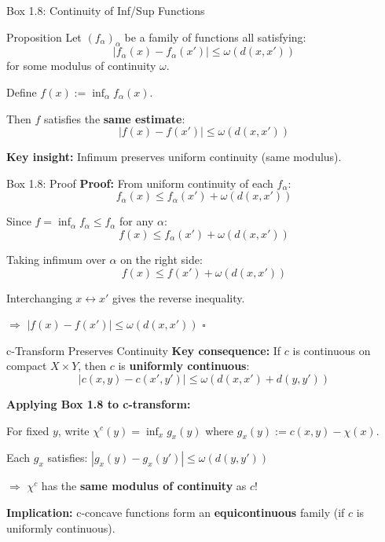 \documentclass[aspectratio=169]{beamer}
\begin{document}
\begin{frame}{Box 1.8: Continuity of Inf/Sup Functions}
\begin{block}{Proposition}
Let $(f_\alpha)_\alpha$ be a family of functions all satisfying:
\[
|f_\alpha(x) - f_\alpha(x')| \leq \omega(d(x,x'))
\]
for some modulus of continuity $\omega$.

Define $f(x) := \inf_\alpha f_\alpha(x)$.

Then $f$ satisfies the \textbf{same estimate}:
\[
|f(x) - f(x')| \leq \omega(d(x,x'))
\]
\end{block}

\vspace{0.3cm}
\textbf{Key insight:} Infimum preserves uniform continuity (same modulus).
\end{frame}

\begin{frame}{Box 1.8: Proof}
\textbf{Proof:} From uniform continuity of each $f_\alpha$:
\[
f_\alpha(x) \leq f_\alpha(x') + \omega(d(x,x'))
\]

Since $f = \inf_\alpha f_\alpha \leq f_\alpha$ for any $\alpha$:
\[
f(x) \leq f_\alpha(x') + \omega(d(x,x'))
\]

Taking infimum over $\alpha$ on the right side:
\[
f(x) \leq f(x') + \omega(d(x,x'))
\]

Interchanging $x \leftrightarrow x'$ gives the reverse inequality.

\vspace{0.3cm}
$\Rightarrow$ $|f(x) - f(x')| \leq \omega(d(x,x'))$ \hfill $\square$
\end{frame}

\begin{frame}{c-Transform Preserves Continuity}
\textbf{Key consequence:} If $c$ is continuous on compact $X \times Y$, then $c$ is \textbf{uniformly continuous}:
\[
|c(x,y) - c(x',y')| \leq \omega(d(x,x') + d(y,y'))
\]

\vspace{0.3cm}
\textbf{Applying Box 1.8 to c-transform:}

For fixed $y$, write $\chi^c(y) = \inf_x g_x(y)$ where $g_x(y) := c(x,y) - \chi(x)$.

Each $g_x$ satisfies: $|g_x(y) - g_x(y')| \leq \omega(d(y,y'))$

\vspace{0.2cm}
$\Rightarrow$ $\chi^c$ has the \textbf{same modulus of continuity} as $c$!

\vspace{0.4cm}
\textbf{Implication:} c-concave functions form an \textbf{equicontinuous} family (if $c$ is uniformly continuous).
\end{frame}
\end{document}
